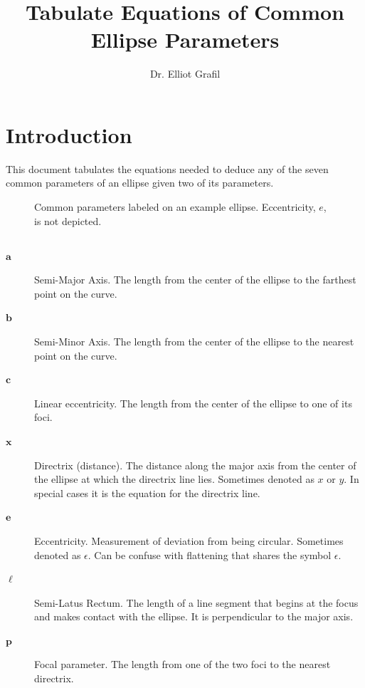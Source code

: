 \documentclass{article}
\title{\vspace{-2.5cm}Tabulate Equations of Common Ellipse Parameters}
\author{Dr. Elliot Grafil}
\begin{document}
\maketitle
\section*{Introduction}
This document tabulates the equations needed to deduce any of the seven common parameters of an ellipse given two of its parameters. 
\begin{figure}[H]
\begin{center}
\noindent{}
  \caption{Common parameters labeled on an example ellipse. Eccentricity, $e$, is not depicted.}
  \label{fig:boat1}
  \end{center}
\end{figure}
\subsection*{}
\begin{description}
\item[$\boldsymbol{a}$] Semi-Major Axis. The length from the center of the ellipse to the farthest point on the curve.
\item[$\boldsymbol{b}$] Semi-Minor Axis. The length from the center of the ellipse to the nearest point on the curve.
\item[$\boldsymbol{c}$] Linear eccentricity. The length from the center of the ellipse to one of its foci.
\item[$\boldsymbol{x}$] Directrix (distance). The distance along the major axis from the center of the ellipse at which the directrix line lies. Sometimes denoted as $x$ or $y$. In special cases it is the equation for the directrix line.
\item[$\boldsymbol{e}$] Eccentricity. Measurement of deviation from being circular. Sometimes denoted as $\epsilon$. Can be confuse with flattening that shares the symbol $\epsilon$.
\item[$\boldsymbol{\ell}$] Semi-Latus Rectum. The length of a line segment that begins at the focus and makes contact with the ellipse. It is perpendicular to the major axis.
\item[$\boldsymbol{p}$] Focal parameter. The length from one of the two foci to the nearest directrix.
\end{description}
\end{document}
